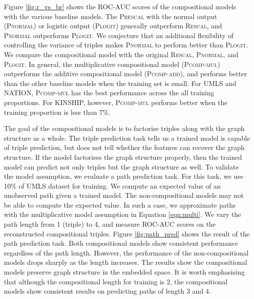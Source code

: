 Figure \ref{fig:r_vs_br} shows the ROC-AUC scores of the compositional models
with the various baseline models. The \textsc{Prescal} with
the normal output (\textsc{Pnormal}) or logistic output (\textsc{Plogit}) generally outperform \textsc{Rescal}, and \textsc{Pnormal} outperforms \textsc{Plogit}.
We conjecture that an additional flexibility of controlling the variance of triples makes \textsc{Pnormal} to perform better than \textsc{Plogit}.
We compare the compositional model with the original \textsc{Rescal}, \textsc{Pnormal}, and \textsc{Plogit}.
In general, the multiplicative compositional model (\textsc{Pcomp-mul}) outperforms
the additive compositional model (\textsc{Pcomp-add}), and performs better than the other baseline models
when the training set is small. For UMLS and NATION, \textsc{Pcomp-mul} has the best performance
across the all training proportions.
For KINSHIP, however, \textsc{Pcomp-mul} performs better when the training proportion is less than 7\%.

The goal of the compositional models is to factorise triples along with the graph structure as a whole.
The triple prediction task tells us a trained model is capable of triple prediction,
but does not tell whether the features can recover the graph structure.
If the model factorises the graph structure properly,
then the trained model can predict not only triples but the graph structure as well.
To validate the model assumption, we evaluate a path prediction task.
For this task, we use 10\% of UMLS dataset for training.
We compute an expected value of an unobserved path given a trained model.
The non-compositional models may not be able to compute the expected value.
In such a case, we approximate paths with the multiplicative model assumption in Equation \ref{eqn:multi}.
We vary the path length from 1 (triple) to 4, and measure ROC-AUC scores on the reconstructed compositional triples.
Figure \ref{fig:path_pred} shows the result of the path prediction task.
Both compositional models show consistent performance regardless of the path length.
However, the performance of the non-compositional models drops sharply as the length increases.
The results show the compositional models preserve graph structure in the embedded space.
It is worth emphasising that although the compositional length for training is 2,
the compositional models show consistent results on predicting paths of length 3 and 4.

